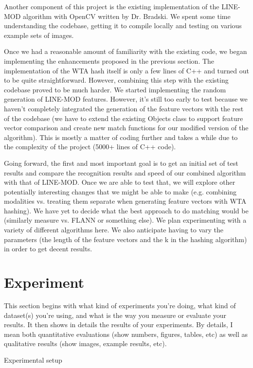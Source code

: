 \documentclass[10pt,twocolumn,letterpaper]{article}
\begin{document}
Another component of this project is the existing implementation of the LINE-MOD algorithm with OpenCV written by Dr. Bradski. We spent some time understanding the codebase, getting it to compile locally and testing on various example sets of images.

Once we had a reasonable amount of familiarity with the existing code, we began implementing the enhancements proposed in the previous section. The implementation of the WTA hash itself is only a few lines of C++ and turned out to be quite straightforward. However, combining this step with the existing codebase proved to be much harder. We started implementing the random generation of LINE-MOD features. However, it's still too early to test because we haven't completely integrated the generation of the feature vectors with the rest of the codebase (we have to extend the existing Objects class to support feature vector comparison and create new match functions for our modified version of the algorithm). This is mostly a matter of coding further and takes a while due to the complexity of the project (5000+ lines of C++ code).

Going forward, the first and most important goal is to get an initial set of test results and compare the recognition results and speed of our combined algorithm with that of LINE-MOD. Once we are able to test that, we will explore other potentially interesting changes that we might be able to make (e.g. combining modalities vs. treating them separate when generating feature vectors with WTA hashing). We have yet to decide what the best approach to do matching would be (similarly measure vs. FLANN or something else). We plan experimenting with a variety of different algorithms here. We also anticipate having to vary the parameters (the length of the feature vectors and the k in the hashing algorithm) in order to get decent results.

\section{Experiment}

This section begins with what kind of experiments you're doing, what kind of dataset(s) you're using, and what is the way you measure or evaluate your results. It then shows in details the results of your experiments. By details, I mean both quantitative evaluations (show numbers, figures, tables, etc) as well as qualitative results (show images, example results, etc).


Experimental setup
\end{document}
